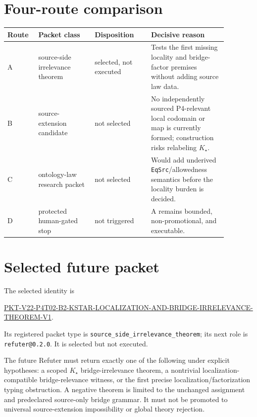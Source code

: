\documentclass[11pt]{article}
\newcommand{\Kstar}{K_{\star}}
\begin{document}
\section{Four-route comparison}

\begin{center}
\small
\begin{tabular}{>{\raggedright\arraybackslash}p{0.11\linewidth}
                >{\raggedright\arraybackslash}p{0.23\linewidth}
                >{\raggedright\arraybackslash}p{0.23\linewidth}
                >{\raggedright\arraybackslash}p{0.31\linewidth}}
\toprule
Route & Packet class & Disposition & Decisive reason\\
\midrule
A & source-side irrelevance theorem & selected, not executed & Tests the first
missing locality and bridge-factor premises without adding source law data.\\
B & source-extension candidate & not selected & No independently sourced
P4-relevant local codomain or map is currently formed; construction risks
relabeling \(\Kstar\).\\
C & ontology-law research packet & not selected & Would add underived
\texttt{EqSrc}/allowedness semantics before the locality burden is decided.\\
D & protected human-gated stop & not triggered & A remains bounded,
non-promotional, and executable.\\
\bottomrule
\end{tabular}
\end{center}

\section{Selected future packet}

The selected identity is
\begin{center}
\small
\url{PKT-V22-P4T02-B2-KSTAR-LOCALIZATION-AND-BRIDGE-IRRELEVANCE-THEOREM-V1}.
\end{center}
Its registered packet type is
\texttt{source\_side\_irrelevance\_theorem}; its next role is
\texttt{refuter@0.2.0}.  It is selected but not executed.

The future Refuter must return exactly one of the following under explicit
hypotheses: a scoped \(\Kstar\) bridge-irrelevance theorem, a nontrivial
localization-compatible bridge-relevance witness, or the first precise
localization/factorization typing obstruction.  A negative theorem is limited
to the unchanged assignment and predeclared source-only bridge grammar.  It
must not be promoted to universal source-extension impossibility or global
theory rejection.
\end{document}

